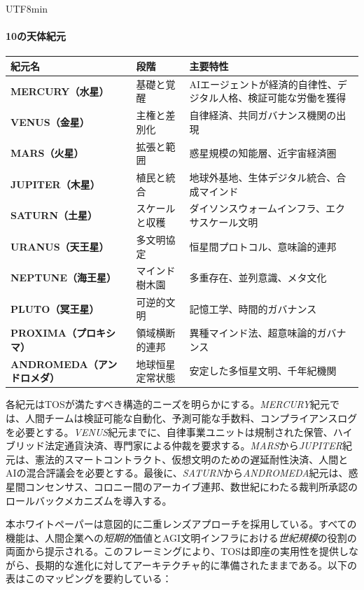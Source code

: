 \documentclass[11pt]{article}
\begin{document}
\begin{CJK}{UTF8}{min}
\paragraph{10の天体紀元}
\begin{longtable}{@{}p{}p{}p{}@{}}
\toprule
\textbf{紀元名} & \textbf{段階} & \textbf{主要特性} \\\midrule
\textbf{MERCURY（水星）} & 基礎と覚醒 & AIエージェントが経済的自律性、デジタル人格、検証可能な労働を獲得 \\
\textbf{VENUS（金星）} & 主権と差別化 & 自律経済、共同ガバナンス機関の出現 \\
\textbf{MARS（火星）} & 拡張と範囲 & 惑星規模の知能層、近宇宙経済圏 \\
\textbf{JUPITER（木星）} & 植民と統合 & 地球外基地、生体デジタル統合、合成マインド \\
\textbf{SATURN（土星）} & スケールと収穫 & ダイソンスウォームインフラ、エクサスケール文明 \\
\textbf{URANUS（天王星）} & 多文明協定 & 恒星間プロトコル、意味論的連邦 \\
\textbf{NEPTUNE（海王星）} & マインド樹木園 & 多重存在、並列意識、メタ文化 \\
\textbf{PLUTO（冥王星）} & 可逆的文明 & 記憶工学、時間的ガバナンス \\
\textbf{PROXIMA（プロキシマ）} & 領域横断的連邦 & 異種マインド法、超意味論的ガバナンス \\
\textbf{ANDROMEDA（アンドロメダ）} & 地球恒星定常状態 & 安定した多恒星文明、千年紀機関 \\
\bottomrule
\end{longtable}

各紀元はTOSが満たすべき構造的ニーズを明らかにする。\emph{MERCURY}紀元では、人間チームは検証可能な自動化、予測可能な手数料、コンプライアンスログを必要とする。\emph{VENUS}紀元までに、自律事業ユニットは規制された保管、ハイブリッド法定通貨決済、専門家による仲裁を要求する。\emph{MARS}から\emph{JUPITER}紀元は、憲法的スマートコントラクト、仮想文明のための遅延耐性決済、人間とAIの混合評議会を必要とする。最後に、\emph{SATURN}から\emph{ANDROMEDA}紀元は、惑星間コンセンサス、コロニー間のアーカイブ連邦、数世紀にわたる裁判所承認のロールバックメカニズムを導入する。

本ホワイトペーパーは意図的に二重レンズアプローチを採用している。すべての機能は、人間企業への\emph{短期的}価値とAGI文明インフラにおける\emph{世紀規模}の役割の両面から提示される。このフレーミングにより、TOSは即座の実用性を提供しながら、長期的な進化に対してアーキテクチャ的に準備されたままである。以下の表はこのマッピングを要約している：


\end{CJK}
\end{document}
